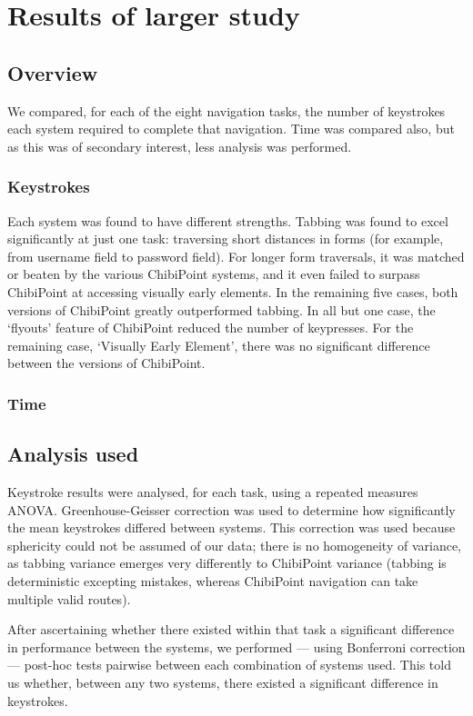 \documentclass[a4paper, 12pt]{report}
\begin{document}
\chapter{Results of larger study}
\section{Overview}
We compared, for each of the eight navigation tasks, the number of keystrokes each system required to complete that navigation. Time was compared also, but as this was of secondary interest, less analysis was performed.
\subsection{Keystrokes}
Each system was found to have different strengths. Tabbing was found to excel significantly at just one task: traversing short distances in forms (for example, from username field to password field). For longer form traversals, it was matched or beaten by the various ChibiPoint systems, and it even failed to surpass ChibiPoint at accessing visually early elements.
In the remaining five cases, both versions of ChibiPoint greatly outperformed tabbing. In all but one case, the `flyouts' feature of ChibiPoint reduced the number of keypresses. For the remaining case, `Visually Early Element', there was no significant difference between the versions of ChibiPoint.
\subsection{Time}
\section{Analysis used}
Keystroke results were analysed, for each task, using a repeated measures ANOVA. Greenhouse-Geisser correction was used to determine how significantly the mean keystrokes differed between systems. This correction was used because sphericity could not be assumed of our data; there is no homogeneity of variance, as tabbing variance emerges very differently to ChibiPoint variance (tabbing is deterministic excepting mistakes, whereas ChibiPoint navigation can take multiple valid routes).

After ascertaining whether there existed within that task a significant difference in performance between the systems, we performed --- using Bonferroni correction --- post-hoc tests pairwise between each combination of systems used. This told us whether, between any two systems, there existed a significant difference in keystrokes.
\end{document}

